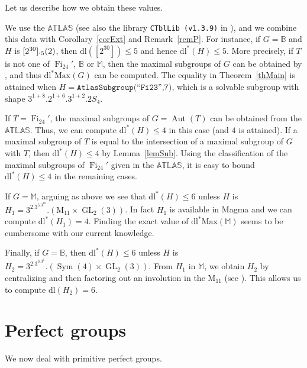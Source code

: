 \documentclass[11pt]{amsart}
\numberwithin{equation}{section}
\theoremstyle{definition}
\theoremstyle{remark}
\newcommand{\Sym}{\mathop{\mathrm{Sym}}}
\newcommand{\Aut}{\mathop{\mathrm{Aut}}}
\DeclareMathOperator{\GL}{GL}
\newcommand{\Fi}{\mathop{\mathrm{Fi}}}
\newcommand{\dll}{\mathrm{dl^*}}
\newcommand{\dl}{\mathrm{dl}}
\newcommand{\dllMax}{\mathrm{dl^*Max}}
\let\L\relax
\DeclareMathOperator{\L}{L}
\newcommand{\Atlas}{\mathbb{A}\mathbb{T}\mathbb{L}\mathbb{A}\mathbb{S}}
\newcommand{\MYhref}[3][black]{\href{#2}{\color{#1}{#3}}}%
\begin{document}
Let us describe how we obtain these values.

We use the $\Atlas$ \texttt{\MYhref[mypink]{https://brauer.maths.qmul.ac.uk/Atlas}{brauer.maths.qmul.ac.uk/Atlas}}
(see also the library \texttt{CTblLib (v1.3.9)} in \cite{GAP4}),
and we combine this data with Corollary~\ref{corExt} and Remark~\ref{remP}.
For instance, if $G = \mathbb{B}$ and $H$ is $[2^{30}].\L_5(2)$, then $\dl([2^{30}]) \leq 5$ and hence $\dll(H) \leq 5$.
More precisely, if $T$ is not one of $\Fi_{24}'$, $\mathbb{B}$ or $\mathbb{M}$, then the maximal subgroups of $G$ can be obtained by \cite{GAP4}, and thus $\dllMax(G)$ can be computed.
The equality in Theorem~\ref{thMain} is attained when $H = \texttt{AtlasSubgroup(``Fi23'',7)}$,
which is a solvable subgroup with shape $3^{1+8}.2^{1+6}.3^{1+2}.2S_4$.

If $T=\Fi_{24}'$, the maximal subgroups of $G=\Aut(T)$ can be obtained from the $\Atlas$. Thus, we can compute $\dll(H) \leq 4$ in this case (and $4$ is attained).
If a maximal subgroup of $T$ is equal to the intersection of a maximal subgroup of $G$ with $T$, then $\dll(H) \leq 4$ by Lemma~\ref{lemSub}.
Using the classification of the maximal subgroups of $\Fi_{24}'$ given in the $\Atlas$,
it is easy to bound $\dll(H) \leq 4$ in the remaining cases.

If $G=\mathbb{M}$, arguing as above we see that $\dll(H) \leq 6$ unless $H$ is $H_1 = 3^2.3^5.3^{10}.(\mathrm{M_{11}} \times \GL_2(3))$. In fact $H_1$ is available in Magma and we can compute $\dll(H_1) =4$.
Finding the exact value of $\dllMax(\mathbb{M})$ seems to be cumbersome with our current knowledge.

Finally, if $G=\mathbb{B}$, then $\dll(H) \leq 6$ unless $H$ is $H_2 = 3^2.3^3.3^6.(\Sym(4) \times \GL_2(3))$. From $H_1$ in $\mathbb{M}$, we obtain $H_2$ by centralizing and then factoring out an involution in the $\mathrm{M_{11}}$
(see \cite[Tab.~1]{AW04}).
This allows us to compute $\dl(H_2)=6$.








\vspace{0.1cm}
\section{Perfect groups} \label{sec4}

We now deal with primitive perfect groups.
\end{document}
